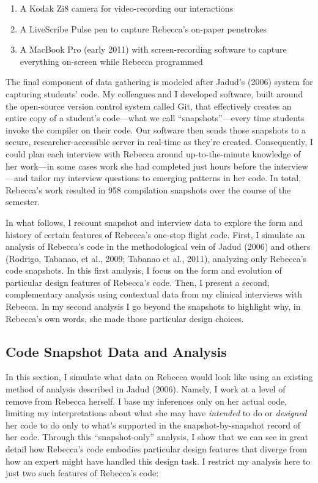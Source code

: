 \begin{enumerate}
\def\labelenumi{\arabic{enumi}.}
\item
  A Kodak Zi8 camera for video-recording our interactions
\item
  A LiveScribe Pulse pen to capture Rebecca's on-paper penstrokes
\item
  A MacBook Pro (early 2011) with screen-recording software to capture
  everything on-screen while Rebecca programmed
\end{enumerate}

The final component of data gathering is modeled after Jadud's (2006)
system for capturing students' code. My colleagues and I developed
software, built around the open-source version control system called
Git, that effectively creates an entire copy of a student's code---what
we call ``snapshots''---every time students invoke the compiler on their
code. Our software then sends those snapshots to a secure,
researcher-accessible server in real-time as they're created.
Consequently, I could plan each interview with Rebecca around
up-to-the-minute knowledge of her work---in some cases work she had
completed just hours before the interview---and tailor my interview
questions to emerging patterns in her code. In total, Rebecca's work
resulted in 958 compilation snapshots over the course of the semester.

In what follows, I recount snapshot and interview data to explore the
form and history of certain features of Rebecca's one-stop flight code.
First, I simulate an analysis of Rebecca's code in the methodological
vein of Jadud (2006) and others (Rodrigo, Tabanao, et al., 2009; Tabanao
et al., 2011), analyzing only Rebecca's code snapshots. In this first
analysis, I focus on the form and evolution of particular design
features of Rebecca's code. Then, I present a second, complementary
analysis using contextual data from my clinical interviews with Rebecca.
In my second analysis I go beyond the snapshots to highlight why, in
Rebecca's own words, she made those particular design choices.

\subsection{Code Snapshot Data and
Analysis}\label{code-snapshot-data-and-analysis}

In this section, I simulate what data on Rebecca would look like using
an existing method of analysis described in Jadud (2006). Namely, I work
at a level of remove from Rebecca herself. I base my inferences only on
her actual code, limiting my interpretations about what she may have
\emph{intended} to do or \emph{designed} her code to do only to what's
supported in the snapshot-by-snapshot record of her code. Through this
``snapshot-only'' analysis, I show that we can see in great detail how
Rebecca's code embodies particular design features that diverge from how
an expert might have handled this design task. I restrict my analysis
here to just two such features of Rebecca's code:

